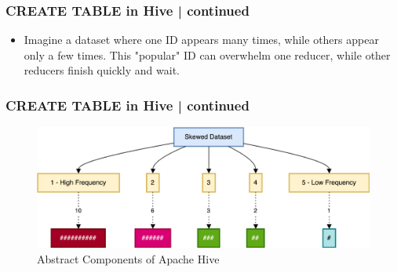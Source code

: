 	\begin{frame}[fragile]
		\frametitle{CREATE TABLE in Hive | continued}    
		\vspace{-0.5cm}		
		\begin{tcolorbox}[colback=white,colframe=black,title= Part 7: Data Skewing]
				\begin{itemize}
					\item Imagine a dataset where one ID appears many times, while others appear only a few times. This "popular" ID can overwhelm one reducer, while other reducers finish quickly and wait.					
				\end{itemize}
				\begin{table}
					\caption{Example of Skewed Data}
					\end{table}
		\end{tcolorbox}
		\end{frame}

	
		\begin{frame}[fragile]
			\frametitle{CREATE TABLE in Hive | continued}  
			\vspace{-0.5cm}		
			\begin{tcolorbox}[colback=white,colframe=black,title= Part 7: Data Skewing]	
				\begin{figure}
					\includegraphics[width=\textwidth,height=.7\textheight,keepaspectratio]{./Figures/chapter-03/dwh_hive-skweed_dt.png}	
					\caption{Abstract Components of Apache Hive}
				\end{figure}
			\end{tcolorbox}
		\end{frame}

